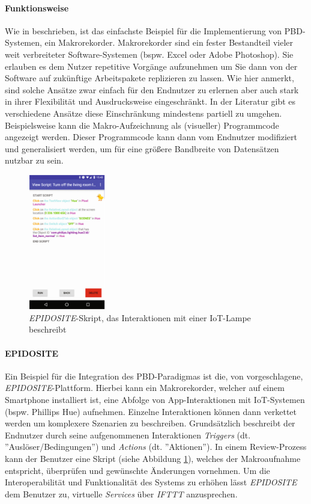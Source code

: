 \paragraph{Funktionsweise} Wie in \cite{cypher1993pbd} beschrieben, ist das einfachste Beispiel für die Implementierung von \ac{PBD}-Systemen, ein Makrorekorder. Makrorekorder sind ein fester Bestandteil vieler weit verbreiteter Software-Systemen (bspw. Excel oder Adobe Photoshop). Sie erlauben es dem Nutzer repetitive Vorgänge aufzunehmen um Sie dann von der Software auf zukünftige Arbeitspakete replizieren zu lassen. Wie \cite{cypher1993pbd} hier anmerkt, sind solche Ansätze zwar einfach für den Endnutzer zu erlernen aber auch stark in ihrer Flexibilität und Ausdrucksweise eingeschränkt. In der Literatur gibt es verschiedene Ansätze diese Einschränkung mindestens partiell zu umgehen. Beispielsweise kann die Makro-Aufzeichnung als (visueller) Programmcode angezeigt werden. Dieser Programmcode kann dann vom Endnutzer modifiziert und generalisiert werden, um für eine größere Bandbreite von Datensätzen nutzbar zu sein.

\begin{figure}[h]
    \centering
    \includegraphics[width=0.3\textwidth]{bilder/chapter2/epidosite__example.png}
    \caption{\textit{EPIDOSITE}-Skript, das Interaktionen mit einer \ac{IoT}-Lampe beschreibt}
    \label{fig:epidositeexample}
\end{figure}

\paragraph{EPIDOSITE} Ein Beispiel für die Integration des \ac{PBD}-Paradigmas ist die, von \cite{li2017programming} vorgeschlagene, \textit{EPIDOSITE}-Plattform. Hierbei kann ein Makrorekorder, welcher auf einem Smartphone installiert ist, eine Abfolge von App-Interaktionen mit IoT-Systemen (bspw. Phillips Hue) aufnehmen. Einzelne Interaktionen können dann verkettet werden um komplexere Szenarien zu beschreiben. Grundsätzlich beschreibt der Endnutzer durch seine aufgenommenen Interaktionen \textit{Triggers} (dt. ''Auslöser/Bedingungen'') und \textit{Actions} (dt. ''Aktionen''). In einem Review-Prozess kann der Benutzer eine Skript (siehe Abbildung \ref{fig:epidositeexample}), welches der Makroaufnahme entspricht, überprüfen und gewünschte Änderungen vornehmen. Um die Interoperabilität und Funktionalität des Systems zu erhöhen lässt \textit{EPIDOSITE} dem Benutzer zu, virtuelle \textit{Services} über \textit{IFTTT} anzusprechen. 


